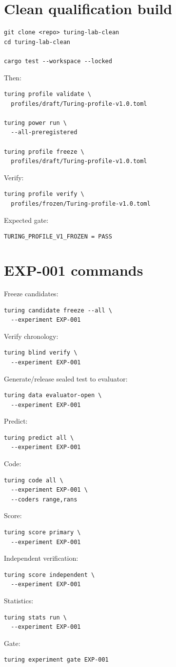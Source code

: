 \documentclass[11pt]{article}
\begin{document}
\section{Clean qualification build}

\begin{verbatim}
git clone <repo> turing-lab-clean
cd turing-lab-clean

cargo test --workspace --locked
\end{verbatim}
Then:
\begin{verbatim}
turing profile validate \
  profiles/draft/Turing-profile-v1.0.toml

turing power run \
  --all-preregistered

turing profile freeze \
  profiles/draft/Turing-profile-v1.0.toml
\end{verbatim}
Verify:
\begin{verbatim}
turing profile verify \
  profiles/frozen/Turing-profile-v1.0.toml
\end{verbatim}
Expected gate:
\begin{verbatim}
TURING_PROFILE_V1_FROZEN = PASS
\end{verbatim}

\section{EXP-001 commands}

Freeze candidates:
\begin{verbatim}
turing candidate freeze --all \
  --experiment EXP-001
\end{verbatim}
Verify chronology:
\begin{verbatim}
turing blind verify \
  --experiment EXP-001
\end{verbatim}
Generate/release sealed test to evaluator:
\begin{verbatim}
turing data evaluator-open \
  --experiment EXP-001
\end{verbatim}
Predict:
\begin{verbatim}
turing predict all \
  --experiment EXP-001
\end{verbatim}
Code:
\begin{verbatim}
turing code all \
  --experiment EXP-001 \
  --coders range,rans
\end{verbatim}
Score:
\begin{verbatim}
turing score primary \
  --experiment EXP-001
\end{verbatim}
Independent verification:
\begin{verbatim}
turing score independent \
  --experiment EXP-001
\end{verbatim}
Statistics:
\begin{verbatim}
turing stats run \
  --experiment EXP-001
\end{verbatim}
Gate:
\begin{verbatim}
turing experiment gate EXP-001
\end{verbatim}
\end{document}
